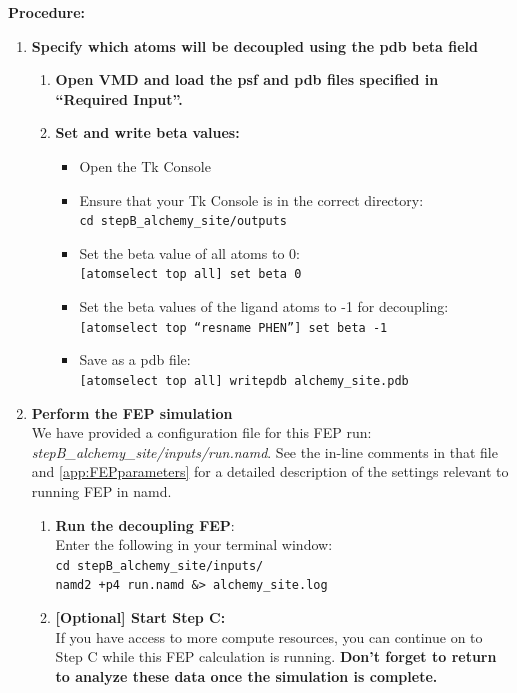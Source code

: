 \documentclass[9pt,tutorial]{Styling/livecoms}
\newcommand{\filepath}[1]{\textit{#1}}
\newcommand{\textInput}[1]{
  \texttt{#1}
}
\begin{document}
\noindent\textbf{Procedure:}
\begin{enumerate}
    \item \textbf{Specify which atoms will be decoupled using the pdb beta field}\label{step:makeFEPpdbSite} 
        \begin{enumerate}[label=\alph*., ref=\theenumi.\alph*]
            \item \textbf{Open VMD and load the psf and pdb files specified in ``Required Input''.}
            \item \textbf{Set and write beta values:}
            \begin{itemize}
                \item Open the Tk Console
                \item Ensure that your Tk Console is in the correct directory:\\
                \textInput{cd stepB\_alchemy\_site/outputs}
                \item Set the beta value of all atoms to 0:\\
                \textInput{[atomselect top all] set beta 0}
                \item Set the beta values of the ligand atoms to -1 for decoupling:\\
                \textInput{[atomselect top ``resname PHEN''] set beta -1}
                \item Save as a pdb file:\\
                \textInput{[atomselect top all] writepdb alchemy\_site.pdb}
            \end{itemize}
        \end{enumerate}

    \item \textbf{Perform the FEP simulation}\\
    We have provided a configuration file for this FEP run: \filepath{stepB\_alchemy\_site/inputs/run.namd}. See the in-line comments in that file and \ref{app:FEPparameters} for a detailed description of the settings relevant to running FEP in namd.
    \begin{enumerate}[label=\alph*., ref=\theenumi.\alph*]     
         \item \textbf{Run the decoupling FEP}:\\
         Enter the following in your terminal window:\\
            \textInput{cd stepB\_alchemy\_site/inputs/}\\
            \textInput{namd2 +p4 run.namd \&> alchemy\_site.log}
        \item \textbf{[Optional] Start Step C:}\\
        If you have access to more compute resources, you can continue on to Step C while this FEP calculation is running. \textbf{Don't forget to return to analyze these data once the simulation is complete.} 
    \end{enumerate}
    

\end{enumerate}
\end{document}
